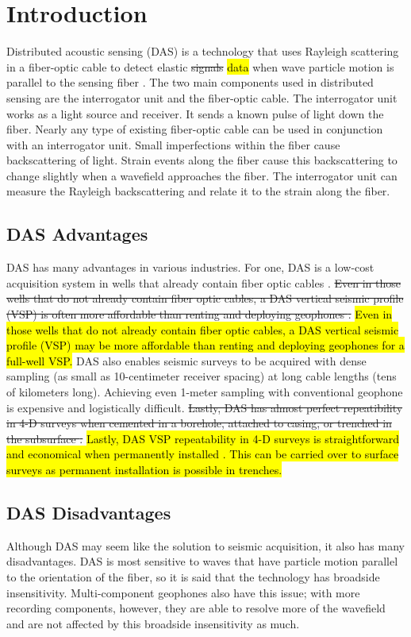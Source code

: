 
\section{Introduction}
Distributed acoustic sensing (DAS) is a technology that uses Rayleigh scattering in a fiber-optic cable to detect elastic \sout{signals} \hl{data} when wave particle motion is parallel to the sensing fiber \citep{hornman2013field}. The two main components used in distributed sensing are the interrogator unit and the fiber-optic cable. The interrogator unit works as a light source and receiver. It sends a known pulse of light down the fiber. Nearly any type of existing fiber-optic cable can be used in conjunction with an interrogator unit. Small imperfections within the fiber cause backscattering of light. Strain events along the fiber cause this backscattering to change slightly when a wavefield approaches the fiber. The interrogator unit can measure the Rayleigh backscattering and relate it to the strain along the fiber.

\subsection{DAS Advantages}
DAS has many advantages in various industries. For one, DAS is a low-cost acquisition system in wells that already contain fiber optic cables \hl{ \citep{mateeva2014distributed} }. \sout{Even in those wells that do not already contain fiber optic cables, a DAS vertical seismic profile (VSP) is often more affordable than renting and deploying geophones \citep{mateeva2014distributed}.} \hl{Even in those wells that do not already contain fiber optic cables, a DAS vertical seismic profile (VSP) may be more affordable than renting and deploying geophones for a full-well VSP.} DAS also enables seismic surveys to be acquired with dense sampling (as small as 10-centimeter receiver spacing) at long cable lengths (tens of kilometers long). Achieving even 1-meter sampling with conventional geophone is expensive and logistically difficult. \sout{Lastly, DAS has almost perfect repeatibility in 4-D surveys when cemented in a borehole, attached to casing, or trenched in the subsurface \citep{mateeva2013distributed}.} \hl{Lastly, DAS VSP repeatability in 4-D surveys is straightforward and economical when permanently installed \citep{mateeva2013distributed}. This can be carried over to surface surveys as permanent installation is possible in trenches.}

\subsection{DAS Disadvantages}
Although DAS may seem like the solution to seismic acquisition, it also has many disadvantages. DAS is most sensitive to waves that have particle motion parallel to the orientation of the fiber, so it is said that the technology has broadside insensitivity.  Multi-component geophones also have this issue; with more recording components, however, they are able to resolve more of the wavefield and are not affected by this broadside insensitivity as much.

